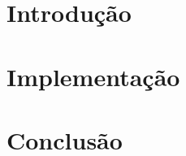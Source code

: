 \documentclass{article}
\begin{document}
\pagestyle{fancy} %
\lhead{\rightmark} %
\chead{} %
\rhead{\leftmark} %
 
\cfoot{\thepage} %
\renewcommand{\footrulewidth}{1pt}


\tableofcontents
\pagebreak
\pagebreak


\section{Introdução}


\section{Implementação}\label{sec:implementacao}



\section{Conclusão}

\end{document}
